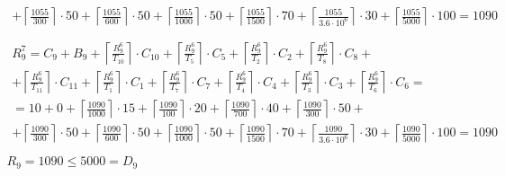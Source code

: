 \begin{gather*}
\begin{multlined}
    + \left\lceil\frac{1055}{300}\right\rceil\cdot 50 + %
    \left\lceil\frac{1055}{600}\right\rceil\cdot 50 + %
    \left\lceil\frac{1055}{1000}\right\rceil\cdot 50 +%
    \left\lceil\frac{1055}{1500}\right\rceil\cdot 70 +%
    \left\lceil\frac{1055}{3.6 \cdot 10^6}\right\rceil\cdot 30 +%
    \left\lceil\frac{1055}{5000}\right\rceil\cdot 100 = 1090 \\
  \end{multlined} \\
  \begin{multlined}
    R_9^7 = C_9 + B_9 + \left\lceil\frac{R_9^6}{T_{10}}\right\rceil\cdot C_{10} + %
    \left\lceil\frac{R_9^6}{T_5}\right\rceil\cdot C_5 + %
    \left\lceil\frac{R_9^6}{T_2}\right\rceil\cdot C_2 + %
    \left\lceil\frac{R_9^6}{T_8}\right\rceil\cdot C_8 + \\%
    + \left\lceil\frac{R_9^6}{T_{11}}\right\rceil\cdot C_{11} + %
    \left\lceil\frac{R_9^6}{T_1}\right\rceil\cdot C_1 +%
    \left\lceil\frac{R_9^6}{T_7}\right\rceil\cdot C_7 +%
    \left\lceil\frac{R_9^6}{T_4}\right\rceil\cdot C_4 +%
    \left\lceil\frac{R_9^6}{T_3}\right\rceil\cdot C_3 +%
    \left\lceil\frac{R_9^6}{T_6}\right\rceil\cdot C_6 = \\%
    = 10 + 0 + \left\lceil\frac{1090}{1000}\right\rceil\cdot 15 + %
    \left\lceil\frac{1090}{100}\right\rceil\cdot 20 + %
    \left\lceil\frac{1090}{700}\right\rceil\cdot 40 + %
    \left\lceil\frac{1090}{300}\right\rceil\cdot 50 + \\%
    + \left\lceil\frac{1090}{300}\right\rceil\cdot 50 + %
    \left\lceil\frac{1090}{600}\right\rceil\cdot 50 + %
    \left\lceil\frac{1090}{1000}\right\rceil\cdot 50 +%
    \left\lceil\frac{1090}{1500}\right\rceil\cdot 70 +%
    \left\lceil\frac{1090}{3.6 \cdot 10^6}\right\rceil\cdot 30 +%
    \left\lceil\frac{1090}{5000}\right\rceil\cdot 100 = 1090 \\
  \end{multlined} \\
  R_9 = 1090 \le 5000 = D_9
\end{gather*}
